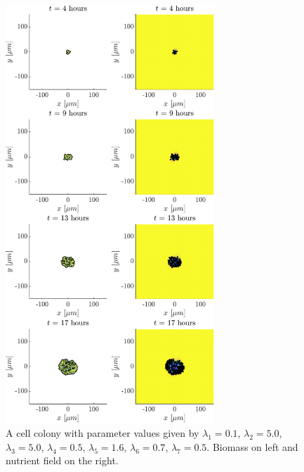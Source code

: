 \begin{figure}[!htb] %
    \centering
    \includegraphics[width= 0.7\textwidth]{
        chapter3/figures/t_all_L1_0o10_L2_5o00_L3_5o00_L4_0o50_L5_1o60_L6_0o70_L7_0o50.pdf}
    \caption{A cell colony with parameter values given by
             $\lambda_1 = 0.1$,  
             $\lambda_2 = 5.0$, 
             $\lambda_3 = 5.0$, 
             $\lambda_4 = 0.5$, 
             $\lambda_5 = 1.6$, 
             $\lambda_6 = 0.7$, 
             $\lambda_7 = 0.5$. 
             Biomass on left and nutrient field on the right.}
    \label{fig: sdsd}
\end{figure}

